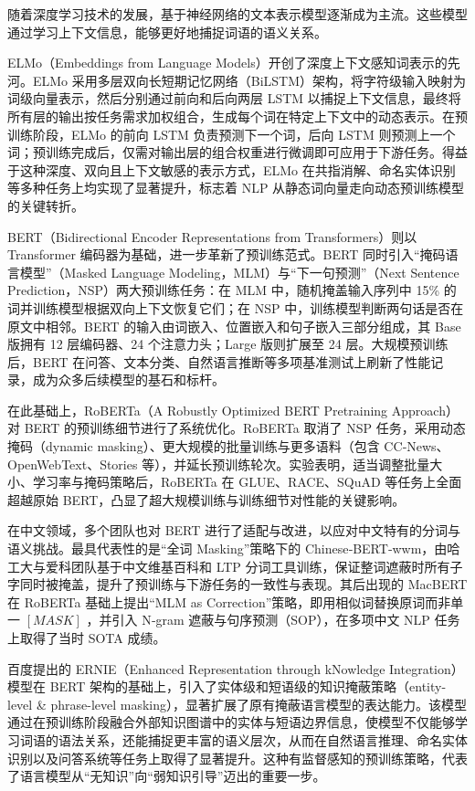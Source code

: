 \documentclass[12pt, a4paper]{ctexart}
\begin{document}
随着深度学习技术的发展，基于神经网络的文本表示模型逐渐成为主流。这些模型通过学习上下文信息，能够更好地捕捉词语的语义关系。

ELMo（Embeddings from Language Models）开创了深度上下文感知词表示的先河\cite{peters2018deepcontextualizedwordrepresentations}。ELMo 采用多层双向长短期记忆网络（BiLSTM）架构，将字符级输入映射为词级向量表示，然后分别通过前向和后向两层 LSTM 以捕捉上下文信息，最终将所有层的输出按任务需求加权组合，生成每个词在特定上下文中的动态表示。在预训练阶段，ELMo 的前向 LSTM 负责预测下一个词，后向 LSTM 则预测上一个词；预训练完成后，仅需对输出层的组合权重进行微调即可应用于下游任务。得益于这种深度、双向且上下文敏感的表示方式，ELMo 在共指消解、命名实体识别等多种任务上均实现了显著提升，标志着 NLP 从静态词向量走向动态预训练模型的关键转折。

BERT（Bidirectional Encoder Representations from Transformers）则以 Transformer 编码器为基础，进一步革新了预训练范式\cite{devlin-etal-2019-bert}。BERT 同时引入“掩码语言模型”（Masked Language Modeling，MLM）与“下一句预测”（Next Sentence Prediction，NSP）两大预训练任务：在 MLM 中，随机掩盖输入序列中 15\% 的词并训练模型根据双向上下文恢复它们；在 NSP 中，训练模型判断两句话是否在原文中相邻。BERT 的输入由词嵌入、位置嵌入和句子嵌入三部分组成，其 Base 版拥有 12 层编码器、24 个注意力头；Large 版则扩展至 24 层。大规模预训练后，BERT 在问答、文本分类、自然语言推断等多项基准测试上刷新了性能记录，成为众多后续模型的基石和标杆。

在此基础上，RoBERTa（A Robustly Optimized BERT Pretraining Approach）对 BERT 的预训练细节进行了系统优化\cite{liu2019robertarobustlyoptimizedbert}。RoBERTa 取消了 NSP 任务，采用动态掩码（dynamic masking）、更大规模的批量训练与更多语料（包含 CC‑News、OpenWebText、Stories 等），并延长预训练轮次。实验表明，适当调整批量大小、学习率与掩码策略后，RoBERTa 在 GLUE、RACE、SQuAD 等任务上全面超越原始 BERT，凸显了超大规模训练与训练细节对性能的关键影响。

在中文领域，多个团队也对 BERT 进行了适配与改进，以应对中文特有的分词与语义挑战。最具代表性的是“全词 Masking”策略下的 Chinese‑BERT‑wwm，由哈工大与爱科团队基于中文维基百科和 LTP 分词工具训练，保证整词遮蔽时所有子字同时被掩盖，提升了预训练与下游任务的一致性与表现\cite{Cui_2021}。其后出现的 MacBERT 在 RoBERTa 基础上提出“MLM as Correction”策略，即用相似词替换原词而非单一 $[MASK]$ ，并引入 N‑gram 遮蔽与句序预测（SOP），在多项中文 NLP 任务上取得了当时 SOTA 成绩\cite{Cui_2020}。

百度提出的 ERNIE（Enhanced Representation through kNowledge Integration）模型在 BERT 架构的基础上，引入了实体级和短语级的知识掩蔽策略（entity-level \& phrase-level masking），显著扩展了原有掩蔽语言模型的表达能力。该模型通过在预训练阶段融合外部知识图谱中的实体与短语边界信息，使模型不仅能够学习词语的语法关系，还能捕捉更丰富的语义层次，从而在自然语言推理、命名实体识别以及问答系统等任务上取得了显著提升\cite{sun2019ernieenhancedrepresentationknowledge}。这种有监督感知的预训练策略，代表了语言模型从“无知识”向“弱知识引导”迈出的重要一步。
\end{document}
